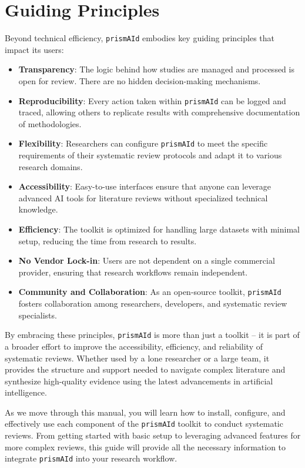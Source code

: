 \section{Guiding Principles}

Beyond technical efficiency, \texttt{prismAId} embodies key guiding principles that impact its users:

\begin{itemize}
    \item \textbf{Transparency}: The logic behind how studies are managed and processed is open for review. There are no hidden decision-making mechanisms.

    \item \textbf{Reproducibility}: Every action taken within \texttt{prismAId} can be logged and traced, allowing others to replicate results with comprehensive documentation of methodologies.

    \item \textbf{Flexibility}: Researchers can configure \texttt{prismAId} to meet the specific requirements of their systematic review protocols and adapt it to various research domains.

    \item \textbf{Accessibility}: Easy-to-use interfaces ensure that anyone can leverage advanced AI tools for literature reviews without specialized technical knowledge.

    \item \textbf{Efficiency}: The toolkit is optimized for handling large datasets with minimal setup, reducing the time from research to results.

    \item \textbf{No Vendor Lock-in}: Users are not dependent on a single commercial provider, ensuring that research workflows remain independent.

    \item \textbf{Community and Collaboration}: As an open-source toolkit, \texttt{prismAId} fosters collaboration among researchers, developers, and systematic review specialists.
\end{itemize}

By embracing these principles, \texttt{prismAId} is more than just a toolkit -- it is part of a broader effort to improve the accessibility, efficiency, and reliability of systematic reviews. Whether used by a lone researcher or a large team, it provides the structure and support needed to navigate complex literature and synthesize high-quality evidence using the latest advancements in artificial intelligence.

As we move through this manual, you will learn how to install, configure, and effectively use each component of the \texttt{prismAId} toolkit to conduct systematic reviews. From getting started with basic setup to leveraging advanced features for more complex reviews, this guide will provide all the necessary information to integrate \texttt{prismAId} into your research workflow.
